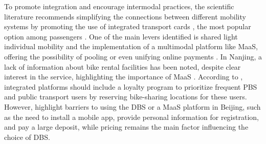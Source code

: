 \begin{refsegment}
To promote integration and encourage intermodal practices, the scientific literature recommends simplifying the connections between different mobility systems by promoting the use of integrated transport cards \textcolor{blue}{\autocite[172]{yang_bike-and-ride_2014}}, the most popular option among passengers \textcolor{blue}{\autocite[10]{yang_empirical_2016}}. One of the main levers identified is shared light individual mobility and the implementation of a multimodal platform like \acrshort{MaaS}, offering the possibility of pooling or even unifying online payments \textcolor{blue}{\autocite[5]{fearnley_patterns_2020}}. In Nanjing, a lack of information about bike rental facilities has been noted, despite clear interest in the service, highlighting the importance of \acrshort{MaaS} \textcolor{blue}{\autocite[136]{chen_determinants_2012}}. According to \textcolor{blue}{\textcite[67]{ma_understanding_2018}}, integrated platforms should include a loyalty program to prioritize frequent \acrshort{PBS} and public transport users by reserving bike-sharing locations for these users. However, \textcolor{blue}{\textcite[12]{fan_how_2019}} highlight barriers to using the \acrshort{DBS} or a \acrshort{MaaS} platform in Beijing, such as the need to install a mobile app, provide personal information for registration, and pay a large deposit, while pricing remains the main factor influencing the choice of \acrshort{DBS}.%


\end{refsegment}
